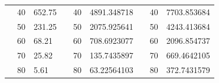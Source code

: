 \begin{table}[h]
\begin{tabular}{|cclcclccl|}
\rowcolor[HTML]{DDFDFF} 
\multicolumn{1}{|c|}{\cellcolor[HTML]{FFFFC7}}                                & \multicolumn{1}{c|}{\cellcolor[HTML]{DDFDFF}40}        & \multicolumn{1}{l|}{\cellcolor[HTML]{DDFDFF}652.75}     & \multicolumn{1}{c|}{\cellcolor[HTML]{FFFFC7}}                                & \multicolumn{1}{c|}{\cellcolor[HTML]{DDFDFF}40}        & \multicolumn{1}{l|}{\cellcolor[HTML]{DDFDFF}4891.348718} & \multicolumn{1}{c|}{\cellcolor[HTML]{FFFFC7}}                                & \multicolumn{1}{c|}{\cellcolor[HTML]{DDFDFF}40}        & 7703.853684 \\ \cline{2-3} \cline{5-6} \cline{8-9} 
\rowcolor[HTML]{DAE8FC} 
\multicolumn{1}{|c|}{\cellcolor[HTML]{FFFFC7}}                                & \multicolumn{1}{c|}{\cellcolor[HTML]{DAE8FC}50}        & \multicolumn{1}{l|}{\cellcolor[HTML]{DAE8FC}231.25}     & \multicolumn{1}{c|}{\cellcolor[HTML]{FFFFC7}}                                & \multicolumn{1}{c|}{\cellcolor[HTML]{DAE8FC}50}        & \multicolumn{1}{l|}{\cellcolor[HTML]{DAE8FC}2075.925641} & \multicolumn{1}{c|}{\cellcolor[HTML]{FFFFC7}}                                & \multicolumn{1}{c|}{\cellcolor[HTML]{DAE8FC}50}        & 4243.413684 \\ \cline{2-3} \cline{5-6} \cline{8-9} 
\rowcolor[HTML]{DDFDFF} 
\multicolumn{1}{|c|}{\cellcolor[HTML]{FFFFC7}}                                & \multicolumn{1}{c|}{\cellcolor[HTML]{DDFDFF}60}        & \multicolumn{1}{l|}{\cellcolor[HTML]{DDFDFF}68.21}      & \multicolumn{1}{c|}{\cellcolor[HTML]{FFFFC7}}                                & \multicolumn{1}{c|}{\cellcolor[HTML]{DDFDFF}60}        & \multicolumn{1}{l|}{\cellcolor[HTML]{DDFDFF}708.6923077} & \multicolumn{1}{c|}{\cellcolor[HTML]{FFFFC7}}                                & \multicolumn{1}{c|}{\cellcolor[HTML]{DDFDFF}60}        & 2096.854737 \\ \cline{2-3} \cline{5-6} \cline{8-9} 
\rowcolor[HTML]{DAE8FC} 
\multicolumn{1}{|c|}{\cellcolor[HTML]{FFFFC7}}                                & \multicolumn{1}{c|}{\cellcolor[HTML]{DAE8FC}70}        & \multicolumn{1}{l|}{\cellcolor[HTML]{DAE8FC}25.82}      & \multicolumn{1}{c|}{\cellcolor[HTML]{FFFFC7}}                                & \multicolumn{1}{c|}{\cellcolor[HTML]{DAE8FC}70}        & \multicolumn{1}{l|}{\cellcolor[HTML]{DAE8FC}135.7435897} & \multicolumn{1}{c|}{\cellcolor[HTML]{FFFFC7}}                                & \multicolumn{1}{c|}{\cellcolor[HTML]{DAE8FC}70}        & 669.4642105 \\ \cline{2-3} \cline{5-6} \cline{8-9} 
\rowcolor[HTML]{DDFDFF} 
\multicolumn{1}{|c|}{\cellcolor[HTML]{FFFFC7}}                                & \multicolumn{1}{c|}{\cellcolor[HTML]{DDFDFF}80}        & \multicolumn{1}{l|}{\cellcolor[HTML]{DDFDFF}5.61}       & \multicolumn{1}{c|}{\cellcolor[HTML]{FFFFC7}}                                & \multicolumn{1}{c|}{\cellcolor[HTML]{DDFDFF}80}        & \multicolumn{1}{l|}{\cellcolor[HTML]{DDFDFF}63.22564103} & \multicolumn{1}{c|}{\cellcolor[HTML]{FFFFC7}}                                & \multicolumn{1}{c|}{\cellcolor[HTML]{DDFDFF}80}        & 372.7431579 \\ \cline{2-3} \cline{5-6} \cline{8-9} 

\end{tabular}
\end{table}
